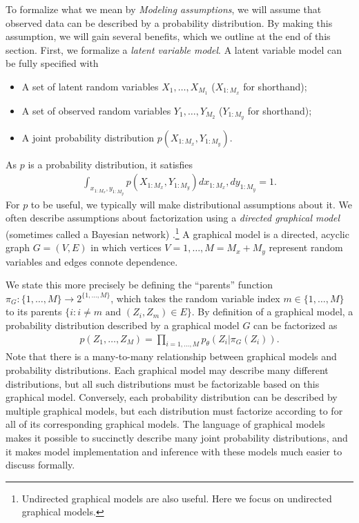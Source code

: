 To formalize what we mean by \emph{Modeling assumptions}, we will
assume that observed data can be described by a probability
distribution.  By making this assumption, we will gain several
benefits, which we outline at the end of this section.  First, we
formalize a \emph{latent variable model}.  A latent variable model can
be fully specified with
\begin{itemize}
  \item A set of latent random variables $X_1, \ldots, X_{M_1}$ ($X_{1:M_x}$ for shorthand);
  \item A set of observed random variables $Y_1, \ldots, Y_{M_2}$ ($Y_{1:M_y}$ for shorthand);
  \item A joint probability distribution $p(X_{1:M_x}, Y_{1:M_y})$.
\end{itemize}
 As $p$ is a probability distribution, it satisfies
\begin{align*}
  \int_{x_{1:M_x}, y_{1:M_y}} p(X_{1:M_x}, Y_{1:M_y}) d x_{1:M_x}, d
  y_{1:M_y} = 1.
\end{align*}  
For $p$ to be useful, we typically will make distributional
assumptions about it.  We often describe assumptions about
factorization using a \emph{directed graphical model} (sometimes
called a Bayesian network) \citep{pearl:1985}.\footnote{Undirected
  graphical models are also useful.  Here we focus on undirected
  graphical models.}  A graphical model is a directed, acyclic graph
$G = (V, E)$ in which vertices $V=1, \ldots, M = M_x + M_y$ represent
random variables and edges connote dependence.

We state this more precisely be defining the ``parents'' function
$\pi_G : \{ 1, \ldots, M \} \rightarrow 2^{\{ 1, \ldots, M \}}$, which
takes the random variable index $m \in \{1, \ldots, M\}$ to its
parents $\{ i : i \neq m \mbox{ and } (Z_i, Z_m) \in E \}$.  By
definition of a graphical model, a probability distribution described
by a graphical model $G$ can be factorized as
\begin{align}
  p(Z_1, \ldots, Z_M) = \prod_{i=1, \ldots, M} p_\theta(Z_i |
  \pi_G(Z_i) ).
\label{eq:gm_definition}
\end{align}
Note that there is a many-to-many relationship between graphical
models and probability distributions. Each graphical model may
describe many different distributions, but all such distributions must
be factorizable based on this graphical model.  Conversely, each
probability distribution can be described by multiple graphical
models, but each distribution must factorize according to
 for all of its corresponding graphical
models. The language of graphical models makes it possible to
succinctly describe many joint probability distributions, and it makes
model implementation and inference with these models much easier to
discuss formally.

